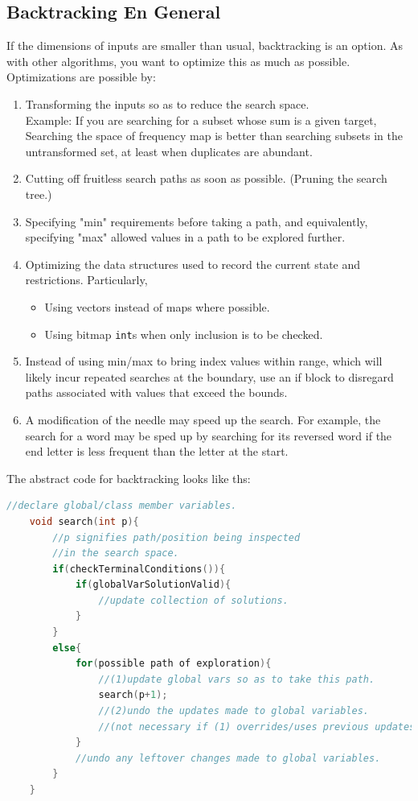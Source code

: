 \documentclass{report}
\begin{document}
\subsection*{Backtracking En General}
If the dimensions of inputs are smaller than usual, backtracking is an option.
As with other algorithms, you want to optimize this as much as possible. Optimizations
are possible by:
\begin{enumerate}
    \item Transforming the inputs so as to reduce the search space.\\
    Example: If you are searching for a subset whose sum is a given target,
    Searching the space of frequency map is better than searching subsets in the
    untransformed set, at least when duplicates are abundant.
    \item Cutting off fruitless search paths as soon as possible. (Pruning the search tree.)
    \item Specifying "min" requirements before taking a path, and equivalently, specifying "max" allowed values in a path to be explored further.
    \item Optimizing the data structures used to record the current state and restrictions. Particularly,
    \begin{itemize}
        \item Using vectors instead of maps where possible.
        \item Using bitmap \texttt{int}s when only inclusion is to be checked.
    \end{itemize}
    \item Instead of using min/max to bring index values within range, which will likely incur repeated
    searches at the boundary, use an if block to disregard paths associated with values
    that exceed the bounds.
    \item A modification of the needle may speed up the search. For example, the search for a word
    may be sped up by searching for its reversed word if the end letter is less frequent than the letter at
    the start.
    
\end{enumerate}
The abstract code for backtracking looks like ths:
\begin{lstlisting}[language=C++]
    //declare global/class member variables.
    void search(int p){
        //p signifies path/position being inspected
        //in the search space.
        if(checkTerminalConditions()){
            if(globalVarSolutionValid){
                //update collection of solutions.
            }
        }
        else{
            for(possible path of exploration){
                //(1)update global vars so as to take this path.
                search(p+1);
                //(2)undo the updates made to global variables.
                //(not necessary if (1) overrides/uses previous updates.)
            }
            //undo any leftover changes made to global variables.
        }
    }
\end{lstlisting}
\end{document}
